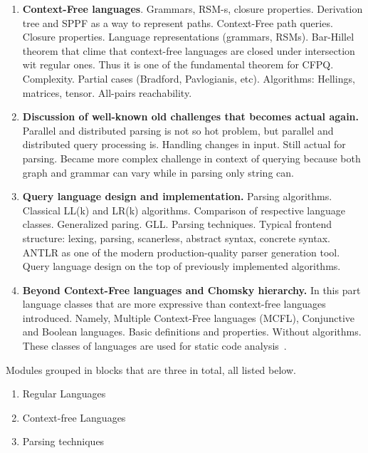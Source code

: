 \documentclass[sigconf]{acmart}
\begin{document}
\begin{enumerate}
  \item \label{cf_languages_intro} \textbf{Context-Free languages}. Grammars, RSM-s, closure properties. Derivation tree and SPPF as a way to represent paths. Context-Free path queries. 
  Closure properties. 
  Language representations (grammars, RSMs). 
  Bar-Hillel theorem that clime that context-free languages are closed under intersection wit regular ones.
  Thus it is one of the fundamental theorem for CFPQ.
  Complexity. 
  Partial cases (Bradford, Pavlogianis, etc).
  Algorithms: Hellings, matrices, tensor. All-pairs reachability.
  
  \item \label{new_old_problems_discussion} \textbf{Discussion of well-known old challenges that becomes actual again.} 
  Parallel and distributed parsing is not so hot problem, but parallel and distributed query processing is. 
  Handling changes in input. 
  Still actual for parsing. 
  Became more complex challenge in context of querying because both graph and grammar can vary while in parsing only string can. 
  
  \item \label{parsing_techniques} \textbf{Query language design and implementation.}
  Parsing algorithms. Classical LL(k) and LR(k) algorithms. Comparison of respective language classes. Generalized paring. GLL.
  Parsing techniques. 
  Typical frontend structure: lexing, parsing, scanerless, abstract syntax, concrete syntax.
  ANTLR as one of the modern production-quality parser generation tool.
  Query language design on the top of previously implemented algorithms. 
    
  \item \label{beyond_chomsky_hierarchy} \textbf{Beyond Context-Free languages and Chomsky hierarchy.}
  In this part language classes that are more expressive than context-free languages introduced. 
  Namely, Multiple Context-Free languages (MCFL), Conjunctive and Boolean languages. 
  Basic definitions and properties. Without algorithms. 
  These classes of languages are used for static code analysis~\cite{10.1145/3009837.3009848, 10.1145/3704854}.

\end{enumerate}

Modules grouped in blocks that are three in total, all listed below.
\begin{enumerate}
  \item Regular Languages
  \item Context-free Languages
  \item Parsing techniques
\end{enumerate}
\end{document}
